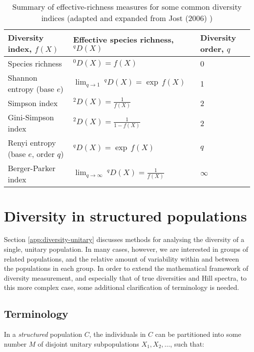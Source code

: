 \begin{table}
\centering
\caption[Summary of effective-richness measures for some common diversity indices]{Summary of effective-richness measures for some common diversity indices (adapted and expanded from Jost (2006) \citep{jost2006entropy})}
\begin{tabular}{lll}\toprule
Diversity index, $f(X)$ & Effective species richness,~$^qD(X)$ & Diversity order, $q$\\\midrule
Species richness & $^0D(X) = f(X)$ & 0 \\
Shannon entropy (base $e$) & $\lim_{q \to 1}~^qD(X) = \exp\,f(X)$ & 1\\
Simpson index & $^2D(X) = \frac{1}{f(X)}$ & 2\\
Gini-Simpson index & $^2D(X) = \frac{1}{1-f(X)}$ & 2\\
Renyi entropy (base $e$, order $q$) & $^qD(X) = \exp\,f(X)$ & $q$\\
Berger-Parker index & $\lim_{q \to \infty}~^qD(X) = \frac{1}{f(X)}$ & $\infty$\\
\bottomrule
\end{tabular}
\label{tab:diversity}
\end{table}

\section{Diversity in structured populations}
\label{app:diversity-structured}

Section \ref{app:diversity-unitary} discusses methods for analysing the diversity of a single, unitary population. In many cases, however, we are interested in groups of related populations, and the relative amount of variability within and between the populations in each group. In order to extend the mathematical framework of diversity measurement, and especially that of true diversities and Hill spectra, to this more complex case, some additional clarification of terminology is needed.

\subsection{Terminology}
\label{app:diversity-structured-terminology}

In a \textit{structured} population $C$, the individuals in $C$ can be partitioned into some number $M$ of disjoint unitary subpopulations $X_1, X_2, \dots$, such that:

